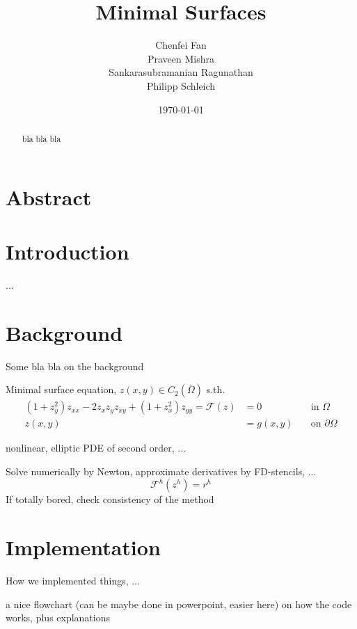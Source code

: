 \documentclass[11pt]{scrartcl}
\title{Minimal Surfaces}
\author{{Chenfei Fan \\  Praveen Mishra \\ Sankarasubramanian Ragunathan\\ Philipp Schleich}}
\date{\today \\ \vspace{0.9cm}}
\newcommand{\mSurf}[1]{\ensuremath{\mathcal{F}(#1)}}
\newcommand{\mSurfDisc}[1]{\ensuremath{\mathcal{F}^h(#1)}}
\begin{document}
\maketitle

\section*{Abstract}
\begin{abstract}
\noindent bla bla bla 
\end{abstract}

\clearpage
\protect \tableofcontents



\newpage
	
\onehalfspacing
\section{Introduction}
...
\section{Background}
Some bla bla on the background

Minimal surface equation, $z(x,y)\in C_2(\bar{\Omega})$ s.th.
\begin{align}
	(1+z_y^2) z_{xx} - 2 z_x z_y z_{xy} + (1+z_x^2)z_{yy} = \mSurf{z} &= 0 \quad &\text{in } \Omega \\
	z(x,y) &= g(x,y) \quad &\text{on } \partial \Omega
\end{align}

nonlinear, elliptic PDE of second order, ...

Solve numerically by Newton, approximate derivatives by FD-stencils, ...
\begin{equation}
	\mSurfDisc{z^h} = r^h
\end{equation}
If totally bored, check consistency of the method



\section{Implementation}

How we implemented things, ...

a nice flowchart (can be maybe done in powerpoint, easier here) on how the code works, plus explanations
\end{document}
